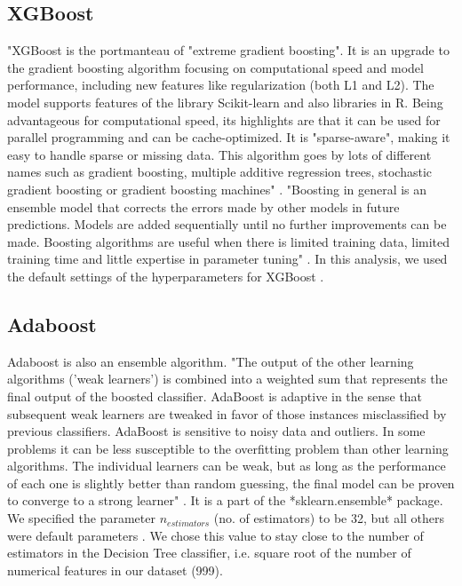 \documentclass[10pt]{article}
\begin{document}
\subsection{XGBoost}
"XGBoost is the portmanteau of "extreme gradient boosting". It is an upgrade to the gradient boosting algorithm focusing on computational speed and model performance, including new features like regularization (both L1 and L2). The model supports features of the library Scikit-learn and also libraries in R. Being advantageous for computational speed, its highlights are that it can be used for parallel programming and can be cache-optimized. It is "sparse-aware", making it easy to handle sparse or missing data. This algorithm goes by lots of different names such as gradient boosting, multiple additive regression trees, stochastic gradient boosting or gradient boosting machines" \cite{gradient_boosting_primer}.
"Boosting in general is an ensemble model that corrects the errors made by other models in future predictions. Models are added sequentially until no further improvements can be made.  Boosting algorithms are useful when there is limited training data, limited training time and little expertise in parameter tuning" \cite{advantages_boosting_algos}.
In this analysis, we used the default settings of the hyperparameters for XGBoost \cite{xgboost_docs}.

\subsection{Adaboost}
Adaboost is also an ensemble algorithm. "The output of the other learning algorithms ('weak learners') is combined into a weighted sum that represents the final output of the boosted classifier. AdaBoost is adaptive in the sense that subsequent weak learners are tweaked in favor of those instances misclassified by previous classifiers. AdaBoost is sensitive to noisy data and outliers. In some problems it can be less susceptible to the overfitting problem than other learning algorithms. The individual learners can be weak, but as long as the performance of each one is slightly better than random guessing, the final model can be proven to converge to a strong learner" \cite{adaboost_wiki}.
It is a part of the *sklearn.ensemble* package. We specified the parameter $n_{estimators}$ (no. of estimators) to be 32, but all others were default parameters \cite{adaboost_defaults}. We chose this value to stay close to the number of estimators in the Decision Tree classifier, i.e. square root of the number of numerical features in our dataset (999).
\end{document}
